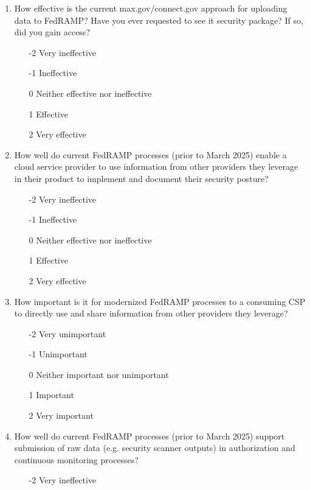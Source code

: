 \documentclass{jdf}
\begin{document}
\begin{enumerate} 
    \item How effective is the current max.gov/connect.gov approach for uploading data to FedRAMP? Have you ever requested to see it security package? If so, did you gain access?
    \begin{enumerate}
        \item [-2] Very ineffective
        \item [-1] Ineffective
        \item  [0] Neither effective nor ineffective
        \item  [1] Effective 
        \item  [2] Very effective
    \end{enumerate}
    \item How well do current FedRAMP processes (prior to March 2025) enable a cloud service provider to use information from other providers they leverage in their product to implement and document their security posture?
    \begin{enumerate}
        \item [-2] Very ineffective
        \item [-1] Ineffective
        \item  [0] Neither effective nor ineffective
        \item  [1] Effective 
        \item  [2] Very effective
    \end{enumerate}
    \item How important is it for modernized FedRAMP processes to a consuming CSP to directly use and share information from other providers they leverage?
    \begin{enumerate}
        \item [-2] Very unimportant
        \item [-1] Unimportant
        \item  [0] Neither important nor unimportant
        \item  [1] Important
        \item  [2] Very important
    \end{enumerate}
    \item How well do current FedRAMP processes (prior to March 2025) support submission of raw data (e.g. security scanner outputs) in authorization and continuous monitoring processes?
    \begin{enumerate}
        \item [-2] Very ineffective

\end{enumerate}
\end{enumerate}
\end{document}
